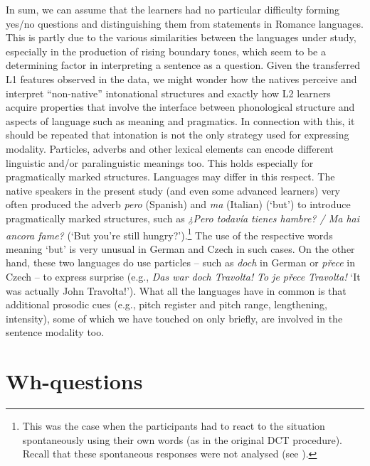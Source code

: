 In sum, we can assume that the learners had no particular difficulty forming yes/no questions and distinguishing them from statements in Romance languages. This is partly due to the various similarities between the languages under study, especially in the production of rising boundary tones, which seem to be a determining factor in interpreting a sentence as a question. Given the transferred L1 features observed in the data, we might wonder how the natives perceive and interpret “non-native” intonational structures and exactly how L2 learners acquire properties that involve the interface between phonological structure and aspects of language such as meaning and pragmatics. In connection with this, it should be repeated that intonation is not the only strategy used for expressing modality. Particles, adverbs and other lexical elements can encode different linguistic and/or paralinguistic meanings too. This holds especially for pragmatically marked structures. Languages may differ in this respect. The native speakers in the present study (and even some advanced learners) very often produced the adverb \textit{pero} (Spanish) and \textit{ma} (Italian) (‘but’) to introduce pragmatically marked structures, such as \textit{¿Pero todavía tienes hambre? / Ma hai ancora fame?} (‘But you’re still hungry?’).\footnote{This was the case when the participants had to react to the situation spontaneously using their own words (as in the original DCT procedure). Recall that these spontaneous responses were not analysed (see ).} The use of the respective words meaning ‘but’ is very unusual in German and Czech in such cases. On the other hand, these two languages do use particles -- such as \textit{doch} in German or \textit{přece} in Czech -- to express surprise (e.g., \textit{Das war doch Travolta!} \textit{To je přece Travolta!} ‘It was actually John Travolta!’). What all the languages have in common is that additional prosodic cues (e.g., pitch register and pitch range, lengthening, intensity), some of which we have touched on only briefly, are involved in the sentence modality too.


\section{Wh-questions}\label{sec:4.4} %

